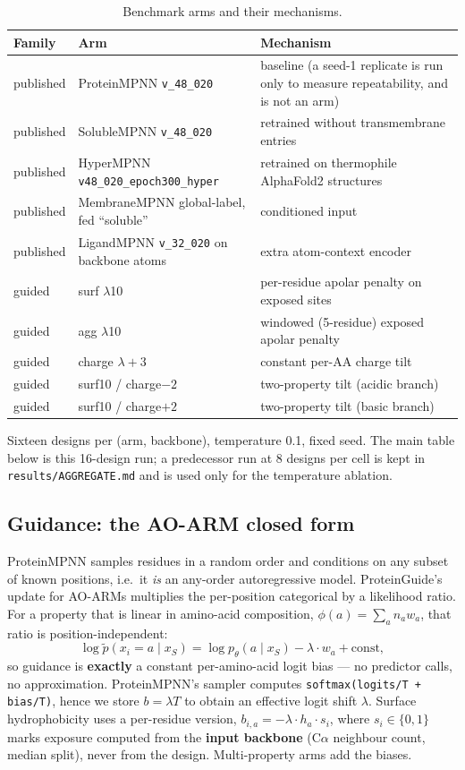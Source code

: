 \begin{table}[htbp]
  \centering
  \small
  \begin{tabular}{@{}llp{2.2in}@{}}
    \toprule
    Family & Arm & Mechanism \\
    \midrule
    published & ProteinMPNN \texttt{v\_48\_020} & baseline (a seed-1 replicate is run only to measure repeatability, and is not an arm) \\
    published & SolubleMPNN \texttt{v\_48\_020} & retrained without transmembrane entries \\
    published & HyperMPNN \texttt{v48\_020\_epoch300\_hyper} & retrained on thermophile AlphaFold2 structures \\
    published & MembraneMPNN global-label, fed ``soluble'' & conditioned input \\
    published & LigandMPNN \texttt{v\_32\_020} on backbone atoms & extra atom-context encoder \\
    guided & surf $\lambda$10 & per-residue apolar penalty on exposed sites \\
    guided & agg $\lambda$10 & windowed (5-residue) exposed apolar penalty \\
    guided & charge $\lambda{+}3$ & constant per-AA charge tilt \\
    guided & surf10 / charge$-2$ & two-property tilt (acidic branch) \\
    guided & surf10 / charge$+2$ & two-property tilt (basic branch) \\
    \bottomrule
  \end{tabular}
  \caption{Benchmark arms and their mechanisms.}
  \label{tab:arms}
\end{table}

Sixteen designs per (arm, backbone), temperature 0.1, fixed seed. The main
table below is this 16-design run; a predecessor run at 8 designs per cell is
kept in \texttt{results/AGGREGATE.md} and is used only for the temperature
ablation.

\subsection{Guidance: the AO-ARM closed form}
\label{sec:guidance}

ProteinMPNN samples residues in a random order and conditions on any subset of
known positions, i.e.\ it \emph{is} an any-order autoregressive model.
ProteinGuide's update for AO-ARMs multiplies the per-position categorical by a
likelihood ratio. For a property that is linear in amino-acid composition,
$\phi(a)=\sum_a n_a w_a$, that ratio is position-independent:
\[
  \log \tilde{p}(x_i{=}a \mid x_S)
  = \log p_\theta(a \mid x_S) - \lambda \cdot w_a + \mathrm{const},
\]
so guidance is \textbf{exactly} a constant per-amino-acid logit bias --- no
predictor calls, no approximation. ProteinMPNN's sampler computes
\texttt{softmax(logits/T + bias/T)}, hence we store $b = \lambda T$ to obtain an
effective logit shift $\lambda$. Surface hydrophobicity uses a per-residue
version, $b_{i,a} = -\lambda \cdot h_a \cdot s_i$, where $s_i \in \{0,1\}$
marks exposure computed from the \textbf{input backbone} (C$\alpha$ neighbour
count, median split), never from the design. Multi-property arms add the biases.

